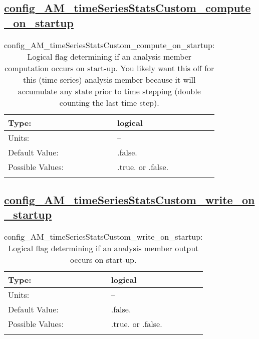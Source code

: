 \subsection[config\_AM\_timeSeriesStatsCustom\_compute\_on\_startup]{\hyperref[sec:nm_tab_AM_timeSeriesStatsCustom]{config\_AM\_timeSeriesStatsCustom\_compute\_on\_startup}}
\label{subsec:nm_sec_config_AM_timeSeriesStatsCustom_compute_on_startup}
\begin{center}
\begin{longtable}{| p{2.0in} || p{4.0in} |}
    \hline
    Type: & logical \\
    \hline
    Units: & -- \\
    \hline
    Default Value: & .false. \\
    \hline
    Possible Values: & .true. or .false. \\
    \hline
    \caption{config\_AM\_timeSeriesStatsCustom\_compute\_on\_startup: Logical flag determining if an analysis member computation occurs on start-up. You likely want this off for this (time series) analysis member because it will accumulate any state prior to time stepping (double counting the last time step).}
\end{longtable}
\end{center}
\subsection[config\_AM\_timeSeriesStatsCustom\_write\_on\_startup]{\hyperref[sec:nm_tab_AM_timeSeriesStatsCustom]{config\_AM\_timeSeriesStatsCustom\_write\_on\_startup}}
\label{subsec:nm_sec_config_AM_timeSeriesStatsCustom_write_on_startup}
\begin{center}
\begin{longtable}{| p{2.0in} || p{4.0in} |}
    \hline
    Type: & logical \\
    \hline
    Units: & -- \\
    \hline
    Default Value: & .false. \\
    \hline
    Possible Values: & .true. or .false. \\
    \hline
    \caption{config\_AM\_timeSeriesStatsCustom\_write\_on\_startup: Logical flag determining if an analysis member output occurs on start-up.}
\end{longtable}
\end{center}
